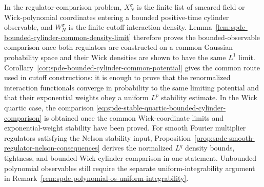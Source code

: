 In the regulator-comparison problem, \(X_N^\sigma\) is the finite list of
smeared field or Wick-polynomial coordinates entering a bounded positive-time
cylinder observable, and \(W_N^\sigma\) is the finite-cutoff interaction
density.  Lemma~\ref{lem:spde-bounded-cylinder-common-density-limit}
therefore proves the bounded-observable comparison once both regulators are
constructed on a common Gaussian probability space and their Wick densities
are shown to have the same \(L^1\) limit.
Corollary~\ref{cor:spde-bounded-cylinder-common-potential}
gives the common route used in cutoff constructions: it is enough to prove
that the renormalized interaction functionals converge in probability to the
same limiting potential and that their exponential weights obey a uniform
\(L^p\) stability estimate.  In the Wick quartic case,
the comparison
\eqref{eq:spde-stable-quartic-bounded-cylinder-comparison} is obtained once
the common Wick-coordinate limits and exponential-weight stability have been
proved.
For smooth Fourier multiplier regulators satisfying the Nelson stability
input, Proposition~\ref{prop:spde-smooth-regulator-nelson-consequences}
derives the normalized \(L^q\) density bounds, tightness, and bounded
Wick-cylinder comparison in one statement.
Unbounded polynomial observables still require the separate
uniform-integrability argument in
Remark~\ref{rem:spde-polynomial-os-uniform-integrability}.

